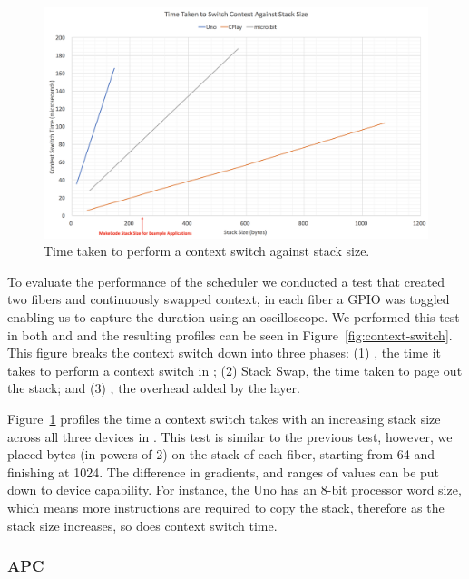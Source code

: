 \begin{figure}[ht]
    \includegraphics[width=.9\columnwidth]{images/context-vs-stack.png}
\caption{\label{fig:context-vs-stack}Time taken to perform a context switch against stack size.}
\end{figure}

To evaluate the performance of the scheduler we conducted a test that created two fibers and continuously swapped context, in each fiber a GPIO was toggled enabling us to capture the duration using an oscilloscope. We performed this test in both \MC and \CO and the resulting profiles can be seen in Figure~\ref{fig:context-switch}. This figure breaks the context switch down into three phases: (1) \CO, the time it takes to perform a context switch in \CO; (2) Stack Swap, the time taken to page out the \MC stack; and (3) \MC, the overhead added by the \MC layer.

Figure~\ref{fig:context-vs-stack} profiles the time a context switch takes with an increasing stack size across all three devices in \CO. This test is similar to the previous test, however, we placed bytes (in powers of 2) on the stack of each fiber, starting from 64 and finishing at 1024. The difference in gradients, and ranges of values can be put down to device capability. For instance, the Uno has an 8-bit processor word size, which means more instructions are required to copy the stack, therefore as the stack size increases, so does context switch time.

\subsubsection{APC}

